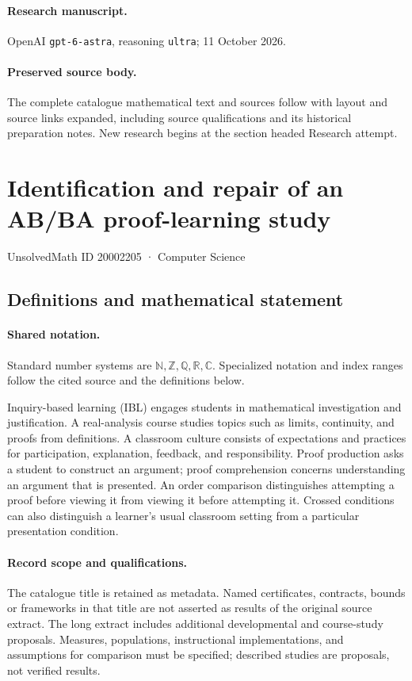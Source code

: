 \documentclass[11pt]{article}
\begin{document}
\paragraph{Research manuscript.} OpenAI \texttt{gpt-6-astra}, reasoning \texttt{ultra}; 11 October 2026.
\paragraph{Preserved source body.} The complete catalogue mathematical text and sources follow with layout and source links expanded, including source qualifications and its historical preparation notes. New research begins at the section headed Research attempt.

\section{Identification and repair of an AB/BA proof-learning study}\label{20002205}
{\small UnsolvedMath ID 20002205 · Computer Science}
\subsection{Definitions and mathematical statement}

\paragraph{Shared notation.}Standard number systems are $\mathbb N,\mathbb Z,\mathbb Q,\mathbb R,\mathbb C$. Specialized notation and index ranges follow the cited source and the definitions below.


Inquiry-based learning (IBL) engages students in mathematical investigation and justification. A real-analysis course studies topics such as limits, continuity, and proofs from definitions. A classroom culture consists of expectations and practices for participation, explanation, feedback, and responsibility. Proof production asks a student to construct an argument; proof comprehension concerns understanding an argument that is presented. An order comparison distinguishes attempting a proof before viewing it from viewing it before attempting it. Crossed conditions can also distinguish a learner's usual classroom setting from a particular presentation condition.
\paragraph{Record scope and qualifications.}
The catalogue title is retained as metadata. Named certificates, contracts, bounds or frameworks in that title are not asserted as results of the original source extract.
The long extract includes additional developmental and course-study proposals. Measures, populations, instructional implementations, and assumptions for comparison must be specified; described studies are proposals, not verified results.
\end{document}
